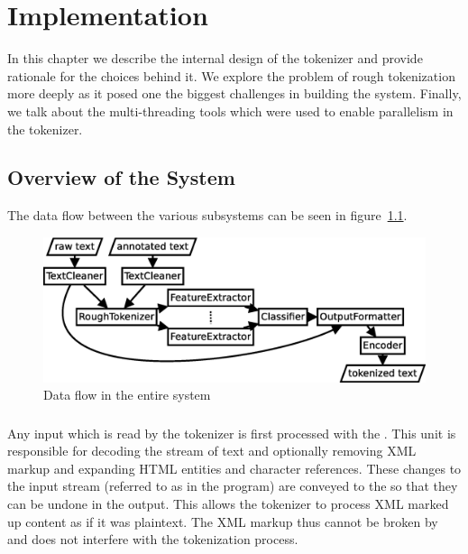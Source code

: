 \chapter{Implementation}
\label{chap:impl}

In this chapter we describe the internal design of the tokenizer and provide
rationale for the choices behind it. We explore the problem of rough
tokenization more deeply as it posed one the biggest challenges in building the
system. Finally, we talk about the multi-threading tools which were used to
enable parallelism in the tokenizer.


\section{Overview of the System}
\label{sec:impl-overview}

The data flow between the various subsystems can be seen in
figure~\ref{fig:all-parts}.

\begin{figure}
  \includegraphics[width=\textwidth]{img/all-parts.eps}
  \caption{Data flow in the entire system}
  \label{fig:all-parts}
\end{figure}

\subsection{}
\label{ssec:impl-overview-textcleaner}

Any input which is read by the tokenizer is first processed with the
. This unit is responsible for decoding the stream of text
and optionally removing XML markup and expanding HTML entities and character
references. These changes to the input stream (referred to as 
in the program) are conveyed to the  so that they can be
undone in the output. This allows the tokenizer to process XML marked up
content as if it was plaintext. The XML markup thus cannot be broken by and
does not interfere with the tokenization process.

